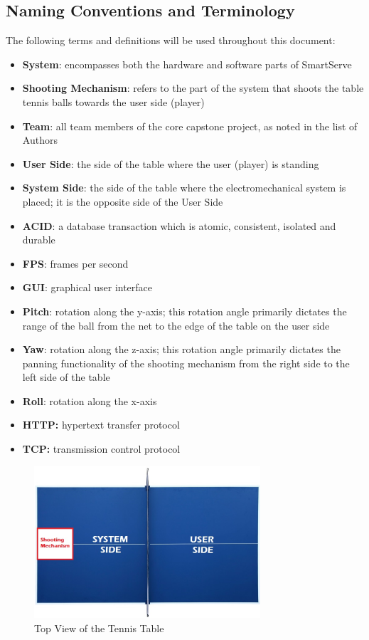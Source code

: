 \documentclass[11pt]{article}
\begin{document}
\subsection{Naming Conventions and Terminology}
\label{sec:definitions}
The following terms and definitions will be used throughout this document:
\begin{itemize}
\item \textbf{System}: encompasses both the hardware and software parts of SmartServe
\item \textbf{Shooting Mechanism}: refers to the part of the system that shoots the table tennis balls towards the user side (player)
\item \textbf{Team}: all team members of the core capstone project, as noted in the list of Authors
\item \textbf{User Side}: the side of the table where the user (player) is standing
\item \textbf{System Side}: the side of the table where the electromechanical system is placed; it is the opposite side of the User Side
\item \textbf{ACID}: a database transaction which is atomic, consistent, isolated and durable
\item \textbf{FPS}: frames per second
\item \textbf{GUI}: graphical user interface
\item \textbf{Pitch}: rotation along the y-axis; this rotation angle primarily dictates the range of the ball from the net to the edge of the table on the user side
\item \textbf{Yaw}: rotation along the z-axis; this rotation angle primarily dictates the panning functionality of the shooting mechanism from the right side to the left side of the table
\item \textbf{Roll}: rotation along the x-axis
\item \textbf{HTTP:} hypertext transfer protocol
\item \textbf{TCP:} transmission control protocol
\end{itemize}
\begin{figure}[H]
   \centering
   \includegraphics[width=0.75\textwidth]{img/Table-Tennis-Top-View.png} %
   \caption{Top View of the Tennis Table}
   \label{fig:table-tennis-top-view}
\end{figure}
\end{document}
